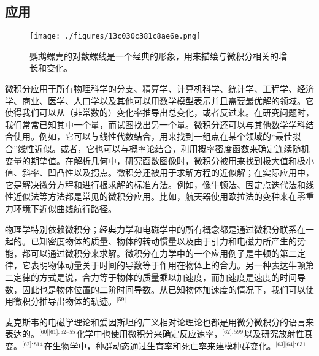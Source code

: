 \subsection{应用}
\begin{figure}[ht]
\centering
\texttt{[image: ./figures/13c030c381c8ae6e.png]}
\caption{鹦鹉螺壳的对数螺线是一个经典的形象，用来描绘与微积分相关的增长和变化。} \label{fig_Calcul_11}
\end{figure}
微积分应用于所有物理科学的分支、精算学、计算机科学、统计学、工程学、经济学、商业、医学、人口学以及其他可以用数学模型表示并且需要最优解的领域。它使得我们可以从（非常数的）变化率推导出总变化，或者反过来。在研究问题时，我们常常已知其中一个量，而试图找出另一个量。微积分还可以与其他数学学科结合使用。例如，它可以与线性代数结合，用来找到一组点在某个领域的“最佳拟合”线性近似。或者，它也可以与概率论结合，利用概率密度函数来确定连续随机变量的期望值。在解析几何中，研究函数图像时，微积分被用来找到极大值和极小值、斜率、凹凸性以及拐点。微积分还被用于求解方程的近似解；在实际应用中，它是解决微分方程和进行根求解的标准方法。例如，像牛顿法、固定点迭代法和线性近似法等方法都是常见的微积分应用。比如，航天器使用欧拉法的变种来在零重力环境下近似曲线航行路径。

物理学特别依赖微积分；经典力学和电磁学中的所有概念都是通过微积分联系在一起的。已知密度物体的质量、物体的转动惯量以及由于引力和电磁力所产生的势能，都可以通过微积分来求解。微积分在力学中的一个应用例子是牛顿的第二定律，它表明物体动量关于时间的导数等于作用在物体上的合力。另一种表达牛顿第二定律的方式是说，合力等于物体的质量乘以加速度，而加速度是速度的时间导数，因此也是物体位置的二阶时间导数。从已知物体加速度的情况下，我们可以使用微积分推导出物体的轨迹。\(^\text{[59]}\)

麦克斯韦的电磁学理论和爱因斯坦的广义相对论理论也都是用微分微积分的语言来表达的。\(^\text{[60][61]: 52–55 }\)化学中也使用微积分来确定反应速率，\(^\text{[62]: 599}\) 以及研究放射性衰变。\(^\text{[62]: 814 }\)在生物学中，种群动态通过生育率和死亡率来建模种群变化。\(^\text{[63][64]: 631 }\)